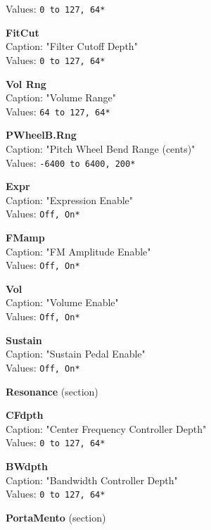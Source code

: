 \documentclass[
 11pt,
 twoside,
 a4paper,
 headinclude,
 footinclude,
 final                                 %
]{article}
\begin{document}
\begin{enumber}
\begin{enumber}
\begin{enumber}
            Values: \texttt{0 to 127, 64*}
         \item \textbf{FitCut} \\
            Caption: "Filter Cutoff Depth" \\
            Values: \texttt{0 to 127, 64*}
         \item \textbf{Vol Rng} \\
            Caption: "Volume Range" \\
            Values: \texttt{64 to 127, 64*}
         \item \textbf{PWheelB.Rng} \\
            Caption: "Pitch Wheel Bend Range (cents)" \\
            Values: \texttt{-6400 to 6400, 200*}
         \item \textbf{Expr} \\
            Caption: "Expression Enable" \\
            Values: \texttt{Off, On*}
         \item \textbf{FMamp} \\
            Caption: "FM Amplitude Enable" \\
            Values: \texttt{Off, On*}
         \item \textbf{Vol} \\
            Caption: "Volume Enable" \\
            Values: \texttt{Off, On*}
         \item \textbf{Sustain} \\
            Caption: "Sustain Pedal Enable" \\
            Values: \texttt{Off, On*}
         \item \textbf{Resonance} (section)
         \begin{enumber}
            \item \textbf{CFdpth} \\
               Caption: "Center Frequency Controller Depth" \\
               Values: \texttt{0 to 127, 64*}
            \item \textbf{BWdpth} \\
               Caption: "Bandwidth Controller Depth" \\
               Values: \texttt{0 to 127, 64*}
         \end{enumber}
         \item \textbf{PortaMento} (section)
         \begin{enumber}

\end{enumber}
\end{enumber}
\end{enumber}
\end{enumber}
\end{document}
